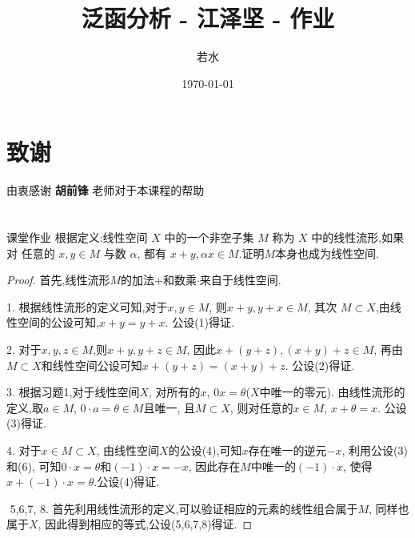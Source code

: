 \documentclass[lang = cn, scheme = chinese]{elegantbook}
\title{泛函分析 - 江泽坚 - 作业}                %
\author{若水}                        %
\date{\today}                       %
\begin{document}
	
	\maketitle       %
	
	\frontmatter     %
	
	\chapter*{致谢}
	
	
	\vspace*{\fill}
		\begin{center}
			
			\large{由衷感谢 \textbf{ 胡前锋 } 老师对于本课程的帮助}
			
		\end{center}
	\vspace*{\fill}
	
	\tableofcontents %
	
	\mainmatter      %
	
	\chapter{}
	
	\begin{proposition}{课堂作业}
		根据定义:线性空间 $X$ 中的一个非空子集 $M$ 称为 $X$ 中的线性流形,如果对 任意的 $x, y \in M$ 与数 $\alpha$, 都有 $x+y, \alpha x \in M$.证明$M$本身也成为线性空间.
	\end{proposition}
	
	\begin{proof}
		首先,线性流形$M$的加法$+$和数乘$\cdot$来自于线性空间.
		
		1. 根据线性流形的定义可知,对于$x, y\in M$, 则$x+y, y+x\in M$, 其次 $M\subset X$,由线性空间的公设可知,$x+y=y+x$. 公设(1)得证.
		
		2. 对于$x,y,z\in M$,则$x+y, y+z\in M$, 因此$x+(y+z),(x+y)+z\in M$, 再由$M\subset X$和线性空间公设可知$x+(y+z)=(x+y)+z$. 公设(2)得证.
		
		3. 根据习题1,对于线性空间$X$, 对所有的$x$, $0x=\theta$($X$中唯一的零元). 由线性流形的定义,取$a\in M$, $0\cdot a=\theta\in M$且唯一, 且$M\subset X$, 则对任意的$x\in M$, $x+\theta=x$. 公设(3)得证.
		
		4. 对于$x\in M\subset X$, 由线性空间$X$的公设(4),可知$x$存在唯一的逆元$-x$, 利用公设(3)和(6), 可知$0\cdot x=\theta$和$(-1)\cdot x =-x$, 因此存在$M$中唯一的$(-1)\cdot x$, 使得 $x+(-1)\cdot x=\theta$.公设(4)得证.
		
		
		​	
		5,6,7, 8. 首先利用线性流形的定义,可以验证相应的元素的线性组合属于$M$, 同样也属于$X$, 因此得到相应的等式,公设(5,6,7,8)得证.
	\end{proof}
	
\end{document}
